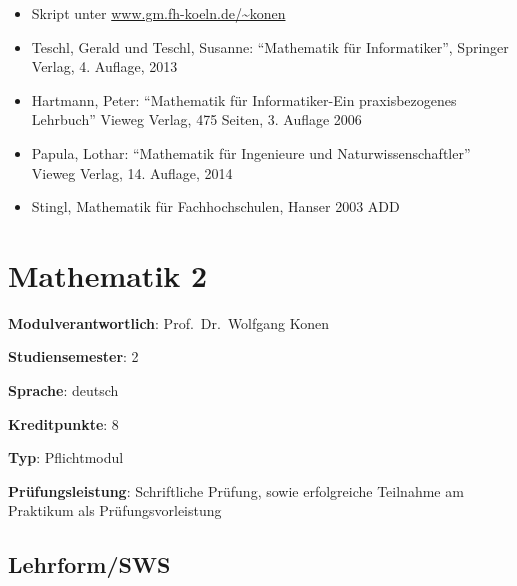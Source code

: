 \begin{itemize}
\tightlist
\item
  Skript unter
  \href{http://www.gm.fh-koeln.de/~konen}{www.gm.fh-koeln.de/\textasciitilde konen}
\item
  Teschl, Gerald und Teschl, Susanne: ``Mathematik für Informatiker'',
  Springer Verlag, 4. Auflage, 2013
\item
  Hartmann, Peter: ``Mathematik für Informatiker-Ein praxisbezogenes
  Lehrbuch'' Vieweg Verlag, 475 Seiten, 3. Auflage 2006
\item
  Papula, Lothar: ``Mathematik für Ingenieure und Naturwissenschaftler''
  Vieweg Verlag, 14. Auflage, 2014
\item
  Stingl, Mathematik für Fachhochschulen, Hanser 2003 ADD
\end{itemize}

\hypertarget{mathematik-2pathlabelmi-2017modulbeschreibungen-bachelorba_mathematik2}{%
\chapter{Mathematik
2\label{/mi-2017/modulbeschreibungen-bachelor/BA_Mathematik2}}\label{mathematik-2pathlabelmi-2017modulbeschreibungen-bachelorba_mathematik2}}

\begin{modulHead}
\textbf{Modulverantwortlich}: Prof.~Dr.~Wolfgang
Konen
\end{modulHead}
\begin{modulHead}
\textbf{Studiensemester}:
2
\end{modulHead}
\begin{modulHead}
\textbf{Sprache}:
deutsch
\end{modulHead}
\begin{modulHead}
\textbf{Kreditpunkte}:
8
\end{modulHead}
\begin{modulHead}
\textbf{Typ}:
Pflichtmodul
\end{modulHead}
\begin{modulHead}
\textbf{Prüfungsleistung}:
Schriftliche Prüfung, sowie erfolgreiche Teilnahme am Praktikum als
Prüfungsvorleistung
\end{modulHead}


\hypertarget{lehrformswspathlabelmi-2017modulbeschreibungen-bachelorba_mathematik2}{%
\section*{Lehrform/SWS\label{/mi-2017/modulbeschreibungen-bachelor/BA_Mathematik2}}\label{lehrformswspathlabelmi-2017modulbeschreibungen-bachelorba_mathematik2}}

